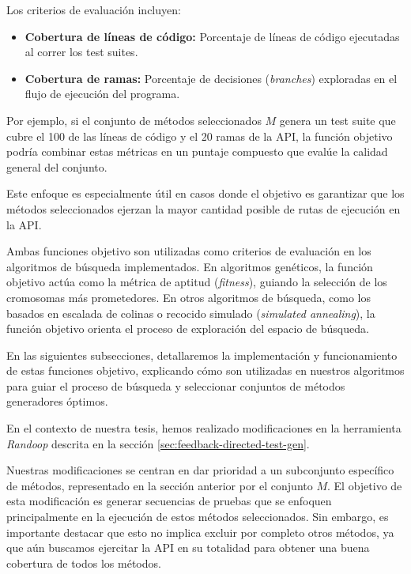 Los criterios de evaluación incluyen:
\begin{itemize}
    \item \textbf{Cobertura de líneas de código:} Porcentaje de líneas de código ejecutadas al correr los test suites.
    \item \textbf{Cobertura de ramas:} Porcentaje de decisiones (\textit{branches}) exploradas en el flujo de ejecución del programa.
\end{itemize}

Por ejemplo, si el conjunto de métodos seleccionados $M$ genera un test suite que cubre el 100 de las líneas de código y el 20 ramas de la API, la función objetivo podría combinar estas métricas en un puntaje compuesto que evalúe la calidad general del conjunto.

Este enfoque es especialmente útil en casos donde el objetivo es garantizar que los métodos seleccionados ejerzan la mayor cantidad posible de rutas de ejecución en la API.

Ambas funciones objetivo son utilizadas como criterios de evaluación en los algoritmos de búsqueda implementados. En algoritmos genéticos, la función objetivo actúa como la métrica de aptitud (\textit{fitness}), guiando la selección de los cromosomas más prometedores. En otros algoritmos de búsqueda, como los basados en escalada de colinas o recocido simulado (\textit{simulated annealing}), la función objetivo orienta el proceso de exploración del espacio de búsqueda.

En las siguientes subsecciones, detallaremos la implementación y funcionamiento de estas funciones objetivo, explicando cómo son utilizadas en nuestros algoritmos para guiar el proceso de búsqueda y seleccionar conjuntos de métodos generadores óptimos.


En el contexto de nuestra tesis, hemos realizado modificaciones en la herramienta \emph{Randoop} descrita en la sección \ref{sec:feedback-directed-test-gen}.

Nuestras modificaciones se centran en dar prioridad a un subconjunto específico de métodos, representado en la sección anterior por el conjunto $M$. El objetivo de esta modificación es generar secuencias de pruebas que se enfoquen principalmente en la ejecución de estos métodos seleccionados. Sin embargo, es importante destacar que esto no implica excluir por completo otros métodos, ya que aún buscamos ejercitar la API en su totalidad para obtener una buena cobertura de todos los métodos.  

